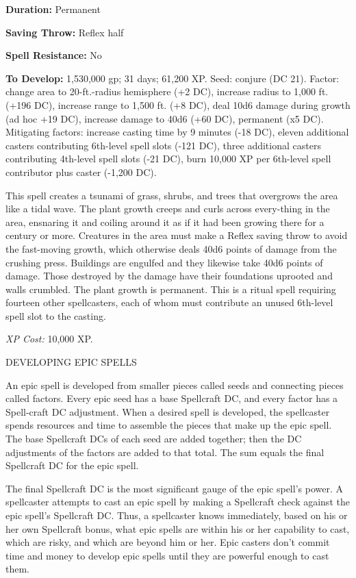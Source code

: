 \documentclass{article}
\begin{document}
\textbf{Duration:} Permanent 

\textbf{Saving Throw:} Reflex half 

\textbf{Spell Resistance:} No 

\textbf{To Develop:} 1,530,000 gp; 31 days; 61,200 XP. Seed: conjure (DC 21). Factor: 
change area to 20-ft.-radius hemisphere (+2 DC), increase radius to 1,000 ft. (+196 
DC), increase range to 1,500 ft. (+8 DC), deal 10d6 damage during growth (ad hoc 
+19 DC), increase damage to 40d6 (+60 DC), permanent (x5 DC). Mitigating factors: 
increase casting time by 9 minutes (-18 DC), eleven additional casters contributing 
6th-level spell slots (-121 DC), three additional casters contributing 4th-level 
spell slots (-21 DC), burn 10,000 XP per 6th-level spell contributor plus caster 
(-1,200 DC).

This spell creates a tsunami of grass, shrubs, and trees that overgrows the area 
like a tidal wave. The plant growth creeps and curls across every-thing in the 
area, ensnaring it and coiling around it as if it had been growing there for a 
century or more. Creatures in the area must make a Reflex saving throw to avoid 
the fast-moving growth, which otherwise deals 40d6 points of damage from the crushing 
press. Buildings are engulfed and they likewise take 40d6 points of damage. Those 
destroyed by the damage have their foundations uprooted and walls crumbled. The 
plant growth is permanent. This is a ritual spell requiring fourteen other spellcasters, 
each of whom must contribute an unused 6th-level spell slot to the casting. 

\textit{XP Cost: }10,000 XP. 

\vspace{12pt}
{\LARGE{}DEVELOPING EPIC SPELLS }

An epic spell is developed from smaller pieces called seeds and connecting pieces 
called factors. Every epic seed has a base Spellcraft DC, and every factor has 
a Spell-craft DC adjustment. When a desired spell is developed, the spellcaster 
spends resources and time to assemble the pieces that make up the epic spell. The 
base Spellcraft DCs of each seed are added together; then the DC adjustments of 
the factors are added to that total. The sum equals the final Spellcraft DC for 
the epic spell. 

The final Spellcraft DC is the most significant gauge of the epic spell's power. 
A spellcaster attempts to cast an epic spell by making a Spellcraft check against 
the epic spell's Spellcraft DC. Thus, a spellcaster knows immediately, based on 
his or her own Spellcraft bonus, what epic spells are within his or her capability 
to cast, which are risky, and which are beyond him or her. Epic casters don't commit 
time and money to develop epic spells until they are powerful enough to cast them. 
\end{document}
